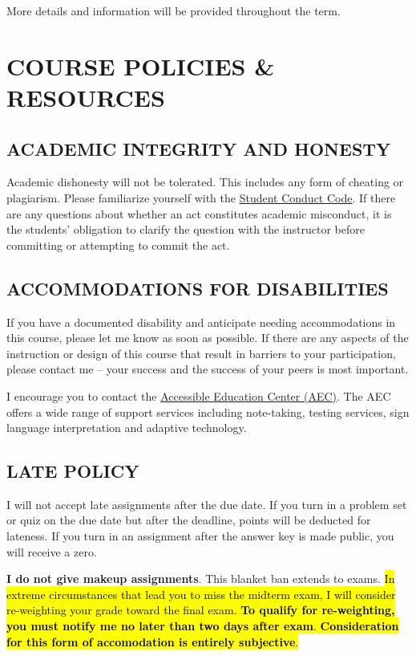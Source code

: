 \documentclass[11pt]{article}
\begin{document}
\noindent More details and information will be provided throughout the term. 

\newpage

\section*{COURSE POLICIES \& RESOURCES}

\subsection*{ACADEMIC INTEGRITY AND HONESTY}
Academic dishonesty will not be tolerated.
This includes any form of cheating or plagiarism.
Please familiarize yourself with the \href{https://policies.uoregon.edu/vol-3-administration-student-affairs/ch-1-conduct/student-conduct-code}{Student Conduct Code}.
If there are any questions about whether an act constitutes academic misconduct, it is the students' obligation to clarify the question with the instructor before committing or attempting to commit the act.

\subsection*{ACCOMMODATIONS FOR DISABILITIES}
If you have a documented disability and anticipate needing accommodations in this course, please let me know as soon as possible.
If there are any aspects of the instruction or design of this course that result in barriers to your participation, please contact me -- your success and the success of your peers is most important. 

I encourage you to contact the \href{https://aec.uoregon.edu/}{Accessible Education Center (AEC)}. The AEC offers a wide range of support services including note-taking, testing services, sign language interpretation and adaptive technology.

\subsection*{LATE POLICY}
I will not accept late assignments after the due date. 
If you turn in a problem set or quiz on the due date but after the deadline, points will be deducted for lateness. 
If you turn in an assignment after the answer key is made public, you will receive a zero. 

\textbf{I do not give makeup assignments}. 
This blanket ban extends to exams. 
\hl{In extreme circumstances that lead you to miss the midterm exam, I will consider re-weighting your grade toward the final exam. 
\textbf{To qualify for re-weighting, you must notify me no later than two days after exam}.
\textbf{Consideration for this form of accomodation is entirely subjective}.} 
\end{document}

